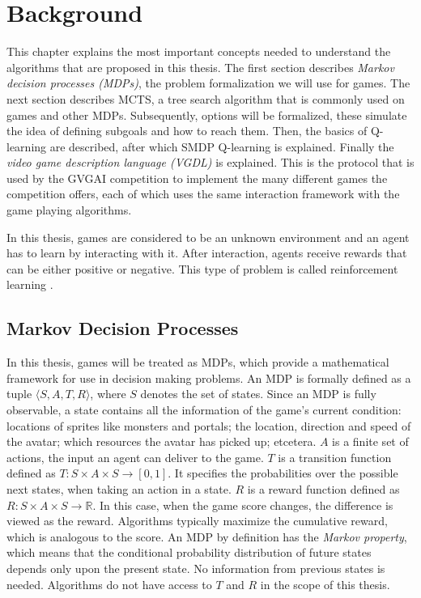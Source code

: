 \chapter{Background}
\label{sec:background}

This chapter explains the most important concepts needed to understand the
algorithms that are proposed in this thesis. The first section describes
\emph{Markov decision processes (MDPs)}, the problem formalization we will use
for games. The next section describes MCTS, a tree search algorithm that is
commonly used on games and other MDPs. Subsequently, options will be formalized,
these simulate the idea of defining subgoals and how to reach them. Then, the
basics of Q-learning are described, after which SMDP Q-learning is explained.
Finally the \emph{video game description language (VGDL)} is explained. This is
the protocol that is used by the GVGAI competition to implement the many
different games the competition offers, each of which uses the same interaction
framework with the game playing algorithms.

In this thesis, games are considered to be an unknown environment and an agent
has to learn by interacting with it. After interaction, agents receive
rewards that can be either positive or negative. This type of problem is called
reinforcement learning \cite{wiering2012reinforcement}.

\section{Markov Decision Processes}
\label{subsec:mdps}
In this thesis, games will be treated as MDPs, which provide a mathematical
framework for use in decision making problems. An MDP is formally defined as a
tuple $\langle S, A, T, R \rangle$, where $S$ denotes the set of states. Since an MDP
is fully observable, a state contains all the information of the
game's current condition: locations of sprites like monsters and portals; the
location, direction and speed of the avatar; which resources the avatar has
picked up; etcetera. $A$ is a finite set of actions, the input an agent can
deliver to the game. $T$ is a transition function defined as $T : S \times A
\times S \rightarrow \left[0,1\right]$. It specifies the probabilities over the
possible next states, when taking an action in a state.  $R$ is a reward
function defined as $R: S \times A \times S \rightarrow \mathbb{R}$. In this
case, when the game score changes, the difference is viewed as the reward.
Algorithms typically maximize the cumulative reward, which is analogous to the
score. An MDP by definition has the \emph{Markov property}, which means that the
conditional probability distribution of future states depends only upon the
present state. No information from previous states is needed. Algorithms do not
have access to $T$ and $R$ in the scope of this thesis.

